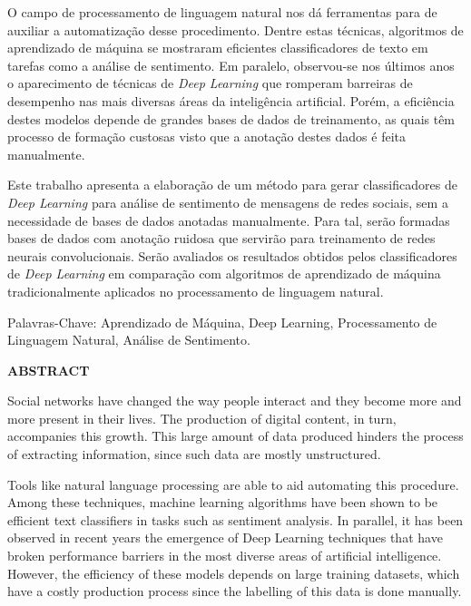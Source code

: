 O campo de processamento de linguagem natural nos dá ferramentas para de auxiliar a automatização desse procedimento.
Dentre estas técnicas, algoritmos de aprendizado de máquina se mostraram eficientes classificadores de texto em tarefas
como a análise de sentimento.
Em paralelo, observou-se nos últimos anos o aparecimento de técnicas de \textit{Deep Learning} que romperam barreiras
de desempenho nas mais diversas áreas da inteligência artificial.
Porém, a eficiência destes modelos depende de grandes bases de dados de treinamento, as quais têm processo de formação
custosas visto que a anotação destes dados é feita manualmente.

Este trabalho apresenta a elaboração de um método para gerar classificadores de \textit{Deep Learning} para análise de
sentimento de mensagens de redes sociais, sem a necessidade de bases de dados anotadas manualmente.
Para tal, serão formadas bases de dados com anotação ruidosa que servirão para treinamento de redes neurais
convolucionais.
Serão avaliados os resultados obtidos pelos classificadores de \textit{Deep Learning} em comparação com algoritmos de
aprendizado de máquina tradicionalmente aplicados no processamento de linguagem natural.

\vspace{1.0cm}

\noindent Palavras-Chave: Aprendizado de Máquina, Deep Learning, Processamento de Linguagem Natural, Análise de Sentimento.

\pagebreak

\begin{center}
\textbf{ABSTRACT}
\end{center}
\vspace{0.5cm}

Social networks have changed the way people interact and they become more and more present in their lives.
The production of digital content, in turn, accompanies this growth.
This large amount of data produced hinders the process of extracting information, since such data are mostly
unstructured.

Tools like natural language processing are able to aid automating this procedure.
Among these techniques, machine learning algorithms have been shown to be efficient text classifiers in tasks such as
sentiment analysis.
In parallel, it has been observed in recent years the emergence of Deep Learning techniques that have broken performance
barriers in the most diverse areas of artificial intelligence.
However, the efficiency of these models depends on large training datasets, which have a costly production process since
the labelling of this data is done manually.

